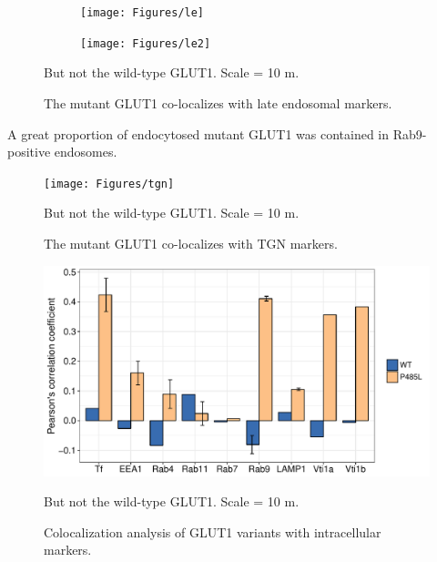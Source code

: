 \begin{figure}[h]
\centering
\begin{subfigure}[h]{\linewidth}
	\texttt{[image: Figures/le]}
	\label{fig:le1}
\end{subfigure}
\end{figure}
%
\begin{figure}[h]\ContinuedFloat
\centering
\begin{subfigure}[h]{\linewidth}
	\texttt{[image: Figures/le2]}
	\label{fig:le2}
\end{subfigure}
\caption{The mutant GLUT1 co-localizes with late endosomal markers.}
\vspace*{-3mm}
\small \justify
But not the wild-type GLUT1. Scale = 10 \textmu m.
\label{fig:le}
\end{figure}
A great proportion of endocytosed mutant GLUT1 was contained in Rab9-positive endosomes.
\begin{figure}[h]
\centering
\texttt{[image: Figures/tgn]}
\caption{The mutant GLUT1 co-localizes with TGN markers.}
\vspace*{-3mm}
\small \justify
But not the wild-type GLUT1. Scale = 10 \textmu m.
\label{fig:tgn}
\end{figure}

\begin{figure}[h]
\centering
\includegraphics[scale=0.7]{Figures/coloc}
\caption{Colocalization analysis of GLUT1 variants with intracellular markers.}
\vspace*{-3mm}
\small \justify
But not the wild-type GLUT1. Scale = 10 \textmu m.
\label{fig:coloc}
\end{figure}
